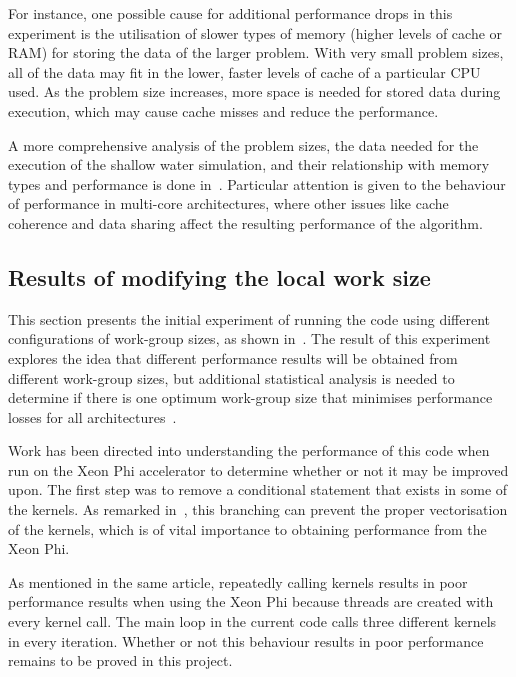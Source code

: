 For instance, one possible cause for additional performance drops in this experiment is the utilisation of slower types of memory (higher levels of cache or RAM) for storing the data of the larger problem. With very small problem sizes, all of the data may fit in the lower, faster levels of cache of a particular CPU used. As the problem size increases, more space is needed for stored data during execution, which may cause cache misses and reduce the performance.

A more comprehensive analysis of the problem sizes, the data needed for the execution of the shallow water simulation, and their relationship with memory types and performance is done in~\cite{pappas2012}. Particular attention is given to the behaviour of performance in multi-core architectures, where other issues like cache coherence and data sharing affect the resulting performance of the algorithm.

\subsection{Results of modifying the local work size}

This section presents the initial experiment of running the code using different configurations of work-group sizes, as shown in~\cite{dolbeau2013one}. The result of this experiment explores the idea that different performance results will be obtained from different work-group sizes, but additional statistical analysis is needed to determine if there is one optimum work-group size that minimises performance losses for all architectures~\cite{dolbeau2013one}.

Work has been directed into understanding the performance of this code when run on the Xeon Phi accelerator to determine whether or not it may be improved upon. The first step was to remove a conditional statement that exists in some of the kernels. As remarked in~\cite{7_software.intel.com_2014}, this branching can prevent the proper vectorisation of the kernels, which is of vital importance to obtaining performance from the Xeon Phi.

As mentioned in the same article, repeatedly calling kernels results in poor performance results when using the Xeon Phi because threads are created with every kernel call. The main loop in the current code calls three different kernels in every iteration. Whether or not this behaviour results in poor performance remains to be proved in this project.


